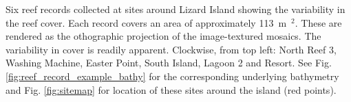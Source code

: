 \label{fig:six_samples} Six reef records collected at sites around Lizard Island showing the variability in the reef cover. Each record covers an area of approximately 113~m~$^2$. These are rendered as the othographic projection of the image-textured mosaics. The variability in cover is readily apparent. Clockwise, from top left: North Reef 3, Washing Machine, Easter Point, South Island, Lagoon 2 and Resort. See Fig. \ref{fig:reef_record_example_bathy} for the corresponding underlying bathymetry and Fig. \ref{fig:sitemap} for location of these sites around the island (red points).